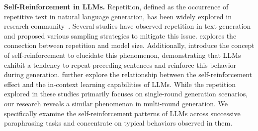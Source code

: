 \textbf{Self-Reinforcement in LLMs.}
Repetition, defined as the occurrence of repetitive text in natural language generation, has been widely explored in research community~\cite{Holtzman2020The,Welleck2020Neural,lin2021straightgradientlearninguse,see_get_2017,liu_text_2019,fu2020a}.
Several studies have observed repetition in text generation \cite{holtzman2020curiouscaseneuraltext,finlayson2023closingcuriouscaseneural} and proposed various sampling strategies to mitigate this issue. \citet{ivgi2025loopsoopsfallbackbehaviors} explores the connection between repetition and model size.
Additionally, \citet{xu_learning_2022} introduce the concept of self-reinforcement to elucidate this phenomenon, demonstrating that LLMs exhibit a tendency to repeat preceding sentences and reinforce this behavior during generation.
\citet{yan_understanding_2024} further explore the relationship between the self-reinforcement effect and the in-context learning capabilities of LLMs.
While the repetition explored in these studies primarily focuses on single-round generation scenarios, our research reveals a similar phenomenon in multi-round generation. 
We specifically examine the self-reinforcement patterns of LLMs across successive paraphrasing tasks and concentrate on typical behaviors observed in them.




